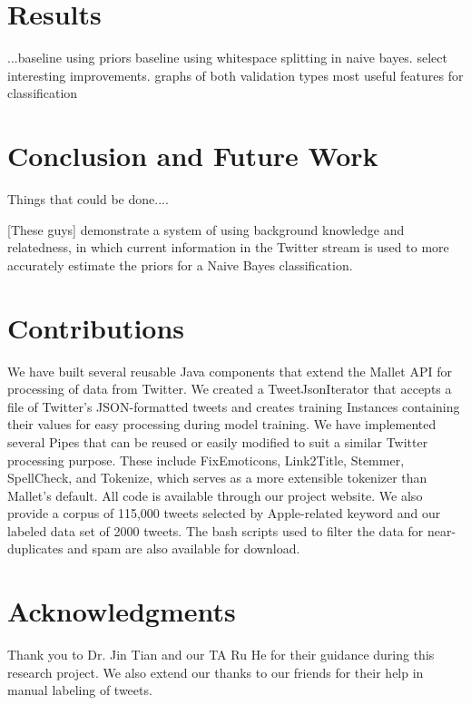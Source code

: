 \documentclass[letterpaper]{article}
\begin{document}
\section{Results}
...baseline using priors
  baseline using whitespace splitting in naive bayes.
  select interesting improvements.
  graphs of both validation types
  most useful features for classification

\section{Conclusion and Future Work}

Things that could be done....

[These guys] demonstrate a system of using background knowledge and relatedness, in which current information in the Twitter stream is used to more accurately estimate the priors for a Naive Bayes classification.

\section{Contributions}
We have built several reusable Java components that extend the Mallet API for processing of data from Twitter. We created a TweetJsonIterator that accepts a file of Twitter's JSON-formatted tweets and creates training Instances containing their values for easy processing during model training. We have implemented several Pipes that can be reused or easily modified to suit a similar Twitter processing purpose. These include FixEmoticons, Link2Title, Stemmer, SpellCheck, and Tokenize, which serves as a more extensible tokenizer than Mallet's default. All code is available through our project website. We also provide a corpus of 115,000 tweets selected by Apple-related keyword and our labeled data set of 2000 tweets. The bash scripts used to filter the data for near-duplicates and spam are also available for download.

\section{ Acknowledgments}
Thank you to Dr. Jin Tian and our TA Ru He for their guidance during this research project. We also extend our thanks to our friends for their help in manual labeling of tweets.
\end{document}
